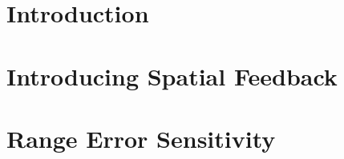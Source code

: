 \documentclass[journal]{IEEEtran}
\begin{document}
\section{Introduction}

\section{Introducing Spatial Feedback}
\label{sec_introduceFeedback}

\section{Range Error Sensitivity}
\label{sec_sim}
\end{document}
